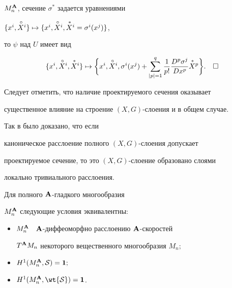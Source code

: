 $M^{\bold A}_n$, сечение $\sigma^*$ задается уравнениями


$\{x^i,{\puto X}{}^i\}\mapsto\{x^i,{\puto X}{}^i,


{\puts X}{}^i=\sigma^i(x^j)\}$,


то $\psi$ над $U$ имеет вид


$$


\{x^i,{\puto X}{}^i,{\puts X}{}^i\}\mapsto


\bigg\{x^i,{\puto X}{}^i,\sigma^i(x^j)+\sum^q_{|p|=1}\frac{1}{p!}


\frac{D^p\sigma^{j}}{Dx^p}{\puts X}{}^p\bigg\}.


\quad \square


$$





Следует отметить, что наличие проектируемого сечения оказывает 


существенное влияние на строение $(X,G)$-слоения и в общем случае.


Так в \cite{Mal3} было доказано, что если


каноническое расслоение полного $(X,G)$-слоения допускает


проектируемое сечение, то это $(X,G)$-слоение образовано слоями


локально тривиального расслоения.








\begin{thm}


Для полного ${\bold A}$-гладкого многообразия


$M^{\bold A}_n$ следующие условия эквивалентны\/${:}$


\begin{itemize}


\item[(i)] $M^{\bold A}_n$ \  ${\bold A}$-диффеоморфно расслоению ${\bold A}$-скоростей


$T^{\bold A} M_n$ некоторого вещественного многообразия $M_n;$


\item[(ii)] $H^1 (M^{\bold A}_n,{\cal S})={\bold 1};$


\item[(iii)] $H^1 (M^\A_n,\wt{\cal S})={\bold 1}$.


\end{itemize}


\end{thm}








